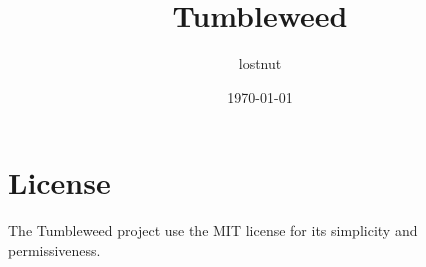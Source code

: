 

\title{Tumbleweed}
\author{lostnut}
\date{\today}


\maketitle
\tableofcontents

\section{License}%
\label{sec:license}

The Tumbleweed project use the MIT license for its simplicity and permissiveness.

